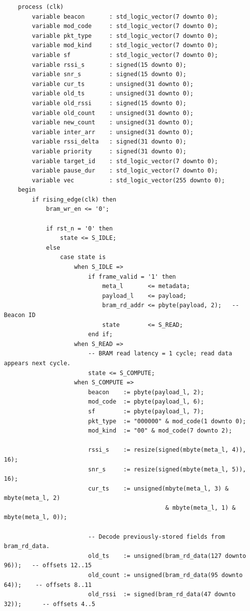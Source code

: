 \documentclass[11pt,letterpaper]{article}
\begin{document}
\begin{lstlisting}
    process (clk)
        variable beacon       : std_logic_vector(7 downto 0);
        variable mod_code     : std_logic_vector(7 downto 0);
        variable pkt_type     : std_logic_vector(7 downto 0);
        variable mod_kind     : std_logic_vector(7 downto 0);
        variable sf           : std_logic_vector(7 downto 0);
        variable rssi_s       : signed(15 downto 0);
        variable snr_s        : signed(15 downto 0);
        variable cur_ts       : unsigned(31 downto 0);
        variable old_ts       : unsigned(31 downto 0);
        variable old_rssi     : signed(15 downto 0);
        variable old_count    : unsigned(31 downto 0);
        variable new_count    : unsigned(31 downto 0);
        variable inter_arr    : unsigned(31 downto 0);
        variable rssi_delta   : signed(31 downto 0);
        variable priority     : signed(31 downto 0);
        variable target_id    : std_logic_vector(7 downto 0);
        variable pause_dur    : std_logic_vector(7 downto 0);
        variable vec          : std_logic_vector(255 downto 0);
    begin
        if rising_edge(clk) then
            bram_wr_en <= '0';

            if rst_n = '0' then
                state <= S_IDLE;
            else
                case state is
                    when S_IDLE =>
                        if frame_valid = '1' then
                            meta_l       <= metadata;
                            payload_l    <= payload;
                            bram_rd_addr <= pbyte(payload, 2);   -- Beacon ID
                            state        <= S_READ;
                        end if;
                    when S_READ =>
                        -- BRAM read latency = 1 cycle; read data appears next cycle.
                        state <= S_COMPUTE;
                    when S_COMPUTE =>
                        beacon    := pbyte(payload_l, 2);
                        mod_code  := pbyte(payload_l, 6);
                        sf        := pbyte(payload_l, 7);
                        pkt_type  := "000000" & mod_code(1 downto 0);
                        mod_kind  := "00" & mod_code(7 downto 2);

                        rssi_s    := resize(signed(mbyte(meta_l, 4)), 16);
                        snr_s     := resize(signed(mbyte(meta_l, 5)), 16);
                        cur_ts    := unsigned(mbyte(meta_l, 3) & mbyte(meta_l, 2)
                                              & mbyte(meta_l, 1) & mbyte(meta_l, 0));

                        -- Decode previously-stored fields from bram_rd_data.
                        old_ts    := unsigned(bram_rd_data(127 downto 96));   -- offsets 12..15
                        old_count := unsigned(bram_rd_data(95 downto 64));    -- offsets 8..11
                        old_rssi  := signed(bram_rd_data(47 downto 32));      -- offsets 4..5


\end{lstlisting}
\end{document}
